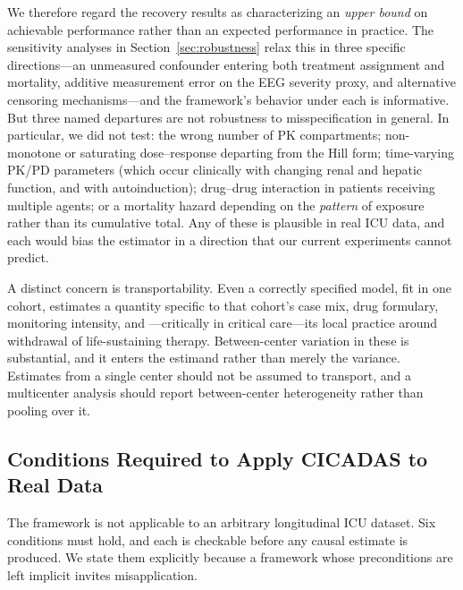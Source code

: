 We therefore regard the recovery results as characterizing an \emph{upper bound} on achievable
performance rather than an expected performance in practice. The sensitivity analyses in
Section~\ref{sec:robustness} relax this in three specific directions---an unmeasured confounder
entering both treatment assignment and mortality, additive measurement error on the EEG severity
proxy, and alternative censoring mechanisms---and the framework's behavior under each is
informative. But three named departures are not robustness to misspecification in general. In
particular, we did not test: the wrong number of PK compartments; non-monotone or saturating
dose--response departing from the Hill form; time-varying PK/PD parameters (which occur clinically
with changing renal and hepatic function, and with autoinduction); drug--drug interaction in
patients receiving multiple agents; or a mortality hazard depending on the \emph{pattern} of
exposure rather than its cumulative total. Any of these is plausible in real ICU data, and each
would bias the estimator in a direction that our current experiments cannot predict.

A distinct concern is transportability. Even a correctly specified model, fit in one cohort,
estimates a quantity specific to that cohort's case mix, drug formulary, monitoring intensity, and
---critically in critical care---its local practice around withdrawal of life-sustaining therapy.
Between-center variation in these is substantial, and it enters the estimand rather than merely the
variance. Estimates from a single center should not be assumed to transport, and a multicenter
analysis should report between-center heterogeneity rather than pooling over it.

\subsection{Conditions Required to Apply CICADAS to Real Data}
\label{sec:conditions}

The framework is not applicable to an arbitrary longitudinal ICU dataset. Six conditions must hold,
and each is checkable before any causal estimate is produced. We state them explicitly because a
framework whose preconditions are left implicit invites misapplication.

